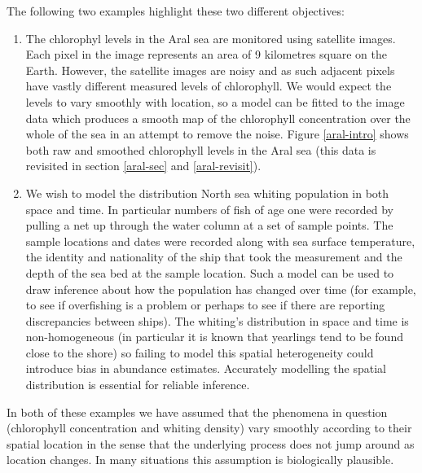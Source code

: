 The following two examples highlight these two different objectives:
\begin{enumerate}
\item The chlorophyl levels in the Aral sea are monitored using satellite images. Each pixel in the image represents an area of 9 kilometres square on the Earth. However, the satellite images are noisy and as such adjacent pixels have vastly different measured levels of chlorophyll. We would expect the levels to vary smoothly with location, so a model can be fitted to the image data which produces a smooth map of the chlorophyll concentration over the whole of the sea in an attempt to remove the noise. Figure \ref{aral-intro} shows both raw and smoothed chlorophyll levels in the Aral sea (this data is revisited in section \ref{aral-sec} and \ref{aral-revisit}).
\item We wish to model the distribution North sea whiting population in both space and time. In particular numbers of fish of age one were recorded by pulling a net up through the water column at a set of sample points. The sample locations and dates were recorded along with sea surface temperature, the identity and nationality of the ship that took the measurement and the depth of the sea bed at the sample location. Such a model can be used to draw inference about how the population has changed over time (for example, to see if overfishing is a problem or perhaps to see if there are reporting discrepancies between ships). The whiting's distribution in space and time is non-homogeneous (in particular it is known that yearlings tend to be found close to the shore) so failing to model this spatial heterogeneity could introduce  bias in abundance estimates. Accurately modelling the spatial distribution is essential for reliable inference.
\end{enumerate}
In both of these examples we have assumed that the phenomena in question (chlorophyll concentration and whiting density) vary smoothly according to their spatial location in the sense that the underlying process does not jump around as location changes. In many situations this assumption is biologically plausible.

